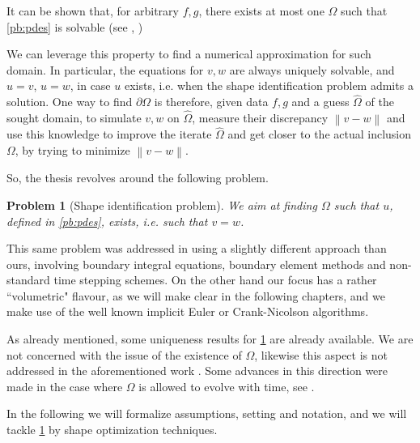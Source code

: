 \documentclass[english,a4paper,9pt,oneside]{scrbook}	%
\theoremstyle{break}
\newtheorem{pb}[equation]{Problem}
\theoremstyle{remark}
\newcommand{\norm}[1]{\left\lVert#1\right\rVert}
\begin{document}
It can be shown that, for arbitrary $f,g$, there exists at most one $\Omega$ such that \cref{pb:pdes} is solvable (see \cite{chapko1}, \cite{chapko2})


We can leverage this property to find a numerical approximation for such domain.
In particular, the equations for $v,w$ are always uniquely solvable, and $u=v$, $u=w$, in case $u$ exists, i.e. when the shape identification problem admits a solution. One way to find $\partial \Omega$ is therefore, given data $f,g$ and a guess $\hat{\Omega}$ of the sought domain, to simulate $v,w$ on $\hat{\Omega}$, measure their discrepancy $\norm{v-w}$ and use this knowledge to improve the iterate $\hat{\Omega}$ and get closer to the actual inclusion $\Omega$, by trying to minimize $\norm{v-w}$.


So, the thesis revolves around the following problem.

\begin{pb}[Shape identification problem]
\label{pb:shid}
We aim at finding $\Omega$ such that $u$, defined in \cref{pb:pdes}, exists, i.e. such that $v=w$.
\end{pb}

This same problem was addressed in \cite{harbrecht} using a slightly different approach than ours, involving boundary integral equations, boundary element methods and non-standard time stepping schemes. On the other hand our focus has a rather ``volumetric" flavour, as we will make clear in the following chapters, and we make use of the well known implicit Euler or Crank-Nicolson algorithms.

As already mentioned, some uniqueness results for \cref{pb:shid} are already available. We are not concerned with the issue of the existence of $\Omega$, likewise this aspect is not addressed in the aforementioned work \cite{harbrecht}. Some advances in this direction were made in the case where $\Omega$ is allowed to evolve with time, see \cite{brugger}.

In the following we will formalize assumptions, setting and notation, and we will tackle \cref{pb:shid} by shape optimization techniques.
\end{document}

